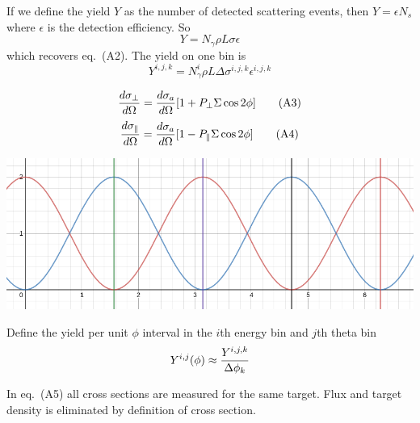 \documentclass{article}
\begin{document}
If we define the yield $Y$ as the number of detected scattering events, then $Y = \epsilon N_s$ where $\epsilon$ is the detection efficiency. So
$$
Y = N_\gamma\rho L\sigma\epsilon
$$
which recovers eq.~(A2). The yield on one bin is
$$
Y^{i,j,k} = N^i_\gamma\rho L\Delta\sigma^{i,j,k}\epsilon^{i,j,k}
$$

\begin{equation}
{d\sigma_\perp \over d\Omega} = {d\sigma_a \over d\Omega}[1+P_\perp\Sigma\cos 2\phi] \tag{A3} \\
\end{equation}
\begin{equation}
{d\sigma_\parallel \over d\Omega} = {d\sigma_a \over d\Omega}[1-P_\parallel\Sigma\cos 2\phi] \tag{A4} \\
\end{equation}

\includegraphics[width=\linewidth]{assymetry.png}

Define the yield per unit $\phi$ interval in the $i$th energy bin and $j$th theta bin
$$
Y^{i,j}(\phi) \approx { Y^{i,j,k} \over \Delta\phi_k }
$$

In eq.~(A5) all cross sections are measured for the same target. Flux and target density is eliminated by definition of cross section.
\end{document}
